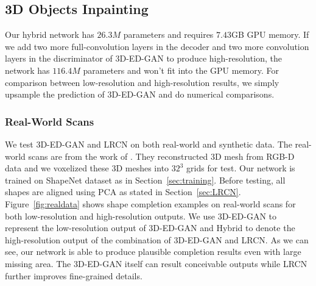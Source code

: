 \documentclass[10pt,twocolumn,letterpaper]{article}
\begin{document}
\subsection{3D Objects Inpainting}%
Our hybrid network has $26.3M$ parameters and requires $7.43$GB GPU memory. If we add two more full-convolution layers in the decoder and two more convolution layers in the discriminator of 3D-ED-GAN to produce high-resolution, the network has $116.4M$ parameters and won't fit into the GPU memory. For comparison between low-resolution and high-resolution results, we simply upsample the prediction of 3D-ED-GAN and do numerical comparisons. 
\subsubsection{Real-World Scans}
We test 3D-ED-GAN and LRCN on both real-world and synthetic data. The real-world scans are from the work of \cite{qimultiview}. They reconstructed 3D mesh from RGB-D data and we voxelized these 3D meshes into $32^3$ grids for test. Our network is trained on ShapeNet dataset as in Section~\ref{sec:training}. Before testing, all shapes are aligned using PCA as stated in Section~\ref{sec:LRCN}. Figure~\ref{fig:realdata} shows shape completion examples on real-world scans for both low-resolution and high-resolution outputs. We use 3D-ED-GAN to represent the low-resolution output of 3D-ED-GAN and Hybrid to denote the high-resolution output of the combination of 3D-ED-GAN and LRCN. As we can see, our network is able to produce plausible completion results even with large missing area. The 3D-ED-GAN itself can result conceivable outputs while LRCN further improves fine-grained details.
\end{document}
